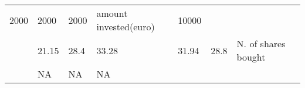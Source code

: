\documentclass[
  11pt,
]{article}
\begin{document}
\begin{longtable}[]{@{}llllllll@{}}
\begin{minipage}[t]{0.07\columnwidth}
2000\strut
\end{minipage} & \begin{minipage}[t]{0.06\columnwidth}\raggedright
2000\strut
\end{minipage} & \begin{minipage}[t]{0.06\columnwidth}\raggedright
2000\strut
\end{minipage} & \begin{minipage}[t]{0.19\columnwidth}\raggedright
amount invested(euro)\strut
\end{minipage} & \begin{minipage}[t]{0.16\columnwidth}\raggedright
10000\strut
\end{minipage}\tabularnewline
\begin{minipage}[t]{0.10\columnwidth}\raggedright
\strut
\end{minipage} & \begin{minipage}[t]{0.06\columnwidth}\raggedright
21.15\strut
\end{minipage} & \begin{minipage}[t]{0.07\columnwidth}\raggedright
28.4\strut
\end{minipage} & \begin{minipage}[t]{0.07\columnwidth}\raggedright
33.28\strut
\end{minipage} & \begin{minipage}[t]{0.06\columnwidth}\raggedright
31.94\strut
\end{minipage} & \begin{minipage}[t]{0.06\columnwidth}\raggedright
28.8\strut
\end{minipage} & \begin{minipage}[t]{0.19\columnwidth}\raggedright
N. of shares bought\strut
\end{minipage} & \begin{minipage}[t]{0.16\columnwidth}\raggedright
\strut
\end{minipage}\tabularnewline
\begin{minipage}[t]{0.10\columnwidth}\raggedright
\strut
\end{minipage} & \begin{minipage}[t]{0.06\columnwidth}\raggedright
NA\strut
\end{minipage} & \begin{minipage}[t]{0.07\columnwidth}\raggedright
NA\strut
\end{minipage} & \begin{minipage}[t]{0.07\columnwidth}\raggedright
NA\strut
\end{minipage} & \begin{minipage}[t]{0.06\columnwidth}\raggedright

\end{minipage}
\end{longtable}
\end{document}

